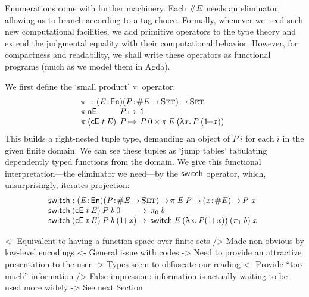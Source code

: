 Enumerations come with further machinery. Each \(\EnumT{E}\) needs an
eliminator, allowing us to branch according to a tag choice. Formally,
whenever we need such new computational facilities, we add primitive
operators to the type theory and extend the judgmental equality with
their computational behavior. However, for compactness and readability, we
shall write these operators as functional programs (much as we
model them in Agda).

We first define the `small product' $\spi{\!}{\!}$ operator:
%
\[\stk{
\spi{}{}: \PITEL{\V{E}}{\EnumU}\PITEL{\V{P}}{\EnumT{\V{E}} \To \Set} \To \Set \\
\begin{array}{@{}l@{\:}l@{\:\mapsto\:\:}l}
\spi{\NilE}{& \V{P}}        & \Unit \\
\spi{(\ConsE{\V{t}}{\V{E}})}{& \V{P}} & \TIMES{\V{P}\: \Ze}{\spi{\V{E}}{(\LAM{\V{x}} \V{P}\: (\Su{\V{x}}))}}
\end{array}
}\]
%
This builds a right-nested
tuple type, demanding an object of $P\:i$ for each $i$ in the given finite
domain. We can see these tuples as `jump tables' tabulating dependently
typed functions from the domain. We give this functional
interpretation---the eliminator we need---by the
$\F{switch}$ operator, which, unsurprisingly, iterates projection:
%
\[\stk{
\begin{array}{@{}ll}
\F{switch} : \PITEL{\V{E}}{\EnumU}
               \PITEL{\V{P}}{\EnumT{\V{E}} \To \Set} \To
              \spi{\V{E}}{\V{P}} \To
               \PITEL{\V{x}}{\EnumT{\V{E}}} \To \V{P}~\x
\end{array} \\
\begin{array}{@{}l@{\:\mapsto\:\:}l}
\switch{(\ConsE{\V{t}}{\V{E}})}{\V{P}}{\V{b}}{\Ze}      & \fst{\V{b}} \\
\switch{(\ConsE{\V{t}}{\V{E}})}{\V{P}}{\V{b}}{(\Su{\V{x}})} & \switch{\V{E}}{(\LAM{\V{x}} \V{P}
  (\Su{\V{x}}))}{(\snd{\V{b}})}{\V{x}}
\end{array}
}\]


\begin{wstructure}
<- Equivalent to having a function space over finite sets
    /> Made non-obvious by low-level encodings
        <- General issue with codes
             -> Need to provide an attractive presentation to the user
    -> Types seem to obfuscate our reading
        <- Provide ``too much'' information
        /> False impression: information is actually waiting to be used more widely
        -> See next Section
\end{wstructure}

